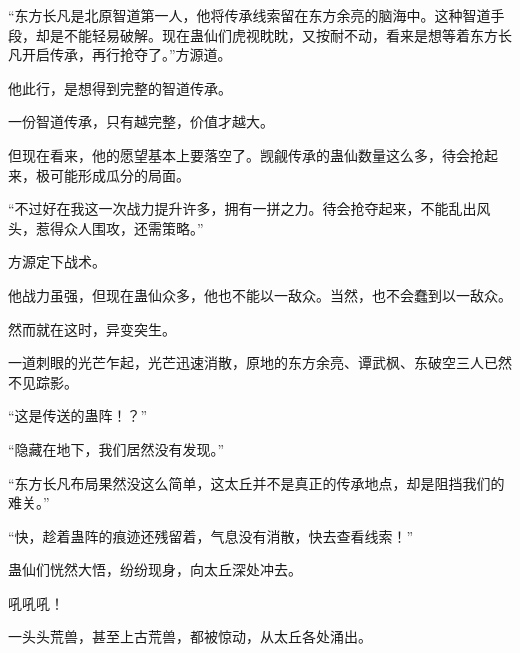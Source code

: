 \begin{this_body}
“东方长凡是北原智道第一人，他将传承线索留在东方余亮的脑海中。这种智道手段，却是不能轻易破解。现在蛊仙们虎视眈眈，又按耐不动，看来是想等着东方长凡开启传承，再行抢夺了。”方源道。

他此行，是想得到完整的智道传承。

一份智道传承，只有越完整，价值才越大。

但现在看来，他的愿望基本上要落空了。觊觎传承的蛊仙数量这么多，待会抢起来，极可能形成瓜分的局面。

“不过好在我这一次战力提升许多，拥有一拼之力。待会抢夺起来，不能乱出风头，惹得众人围攻，还需策略。”

方源定下战术。

他战力虽强，但现在蛊仙众多，他也不能以一敌众。当然，也不会蠢到以一敌众。

然而就在这时，异变突生。

一道刺眼的光芒乍起，光芒迅速消散，原地的东方余亮、谭武枫、东破空三人已然不见踪影。

“这是传送的蛊阵！？”

“隐藏在地下，我们居然没有发现。”

“东方长凡布局果然没这么简单，这太丘并不是真正的传承地点，却是阻挡我们的难关。”

“快，趁着蛊阵的痕迹还残留着，气息没有消散，快去查看线索！”

蛊仙们恍然大悟，纷纷现身，向太丘深处冲去。

吼吼吼！

一头头荒兽，甚至上古荒兽，都被惊动，从太丘各处涌出。

\end{this_body}

